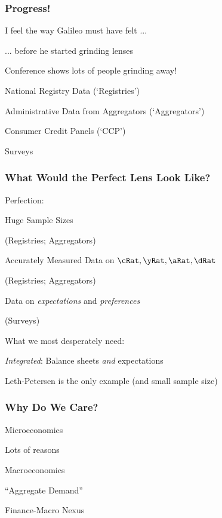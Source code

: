 \begin{frame}[plain]
  \titlepage
\end{frame}


\begin{frame}\frametitle{Progress!}

\pause
\bi
\item I feel the way Galileo must have felt ...
\item ... before he started grinding lenses
\item Conference shows lots of people grinding away!
\bi
\item National Registry Data (`Registries')
\item Administrative Data from Aggregators (`Aggregators')
\item Consumer Credit Panels (`CCP')
\item Surveys
\ei

\ei


\end{frame}

\begin{frame}\frametitle{What Would the Perfect Lens Look Like?}

Perfection:
\bi
\item Huge Sample Sizes
\bi
\item (Registries; Aggregators)
\ei
\item Accurately Measured Data on $\cRat, \yRat, \aRat, \dRat$
\bi
\item (Registries; Aggregators)
\ei
\item Data on {\it expectations} and {\it preferences}
\bi
\item (Surveys)
\ei
\ei

What we most desperately need:
\bi
\item  {\it Integrated}: Balance sheets {\it and} expectations
\item Leth-Petersen is the only example (and small sample size)
\ei

\end{frame}


\begin{frame}\frametitle{Why Do We Care?}

\bi
\item Microeconomics
\bi
\item Lots of reasons
\ei
\item Macroeconomics
\bi
\item ``Aggregate Demand''
\item Finance-Macro Nexus
\ei
\ei

\end{frame}

